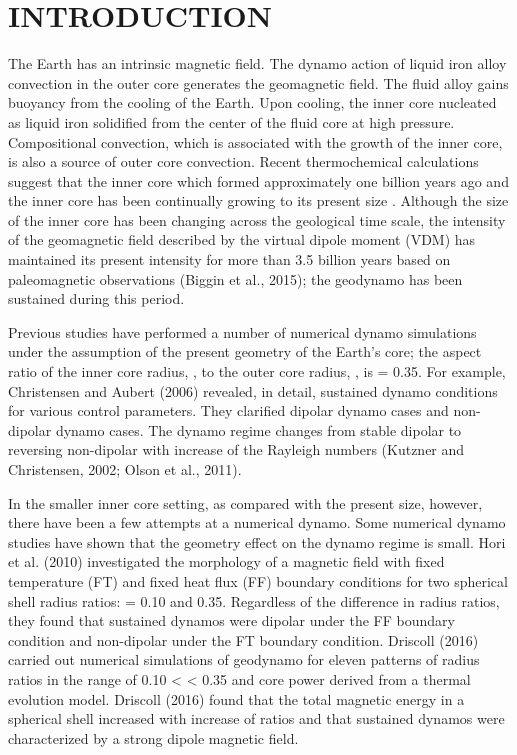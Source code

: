 \section{INTRODUCTION}
The Earth has an intrinsic magnetic field. The dynamo action of liquid iron alloy convection in the outer core generates the geomagnetic field. The fluid alloy gains buoyancy from the cooling of the Earth. Upon cooling, the inner core nucleated as liquid iron solidified from the center of the fluid core at high pressure. Compositional convection, which is associated with the growth of the inner core, is also a source of outer core convection. Recent thermochemical calculations suggest that the inner core which formed approximately one billion years ago and the inner core has been continually growing to its present size \cite{Labrosse:2001}. Although the size of the inner core has been changing across the geological time scale, the intensity of the geomagnetic field described by the virtual dipole moment (VDM) has maintained its present intensity for more than 3.5 billion years based on paleomagnetic observations (Biggin et al., 2015); the geodynamo has been sustained during this period.

Previous studies have performed a number of numerical dynamo simulations under the assumption of the present geometry of the Earth’s core; the aspect ratio of the inner core radius, , to the outer core radius, , is = 0.35. For example, Christensen and Aubert (2006) revealed, in detail, sustained dynamo conditions for various control parameters. They clarified dipolar dynamo cases and non-dipolar dynamo cases. The dynamo regime changes from stable dipolar to reversing non-dipolar with increase of the Rayleigh numbers (Kutzner and Christensen, 2002; Olson et al., 2011).

In the smaller inner core setting, as compared with the present size, however, there have been a few attempts at a numerical dynamo. Some numerical dynamo studies have shown that the geometry effect on the dynamo regime is small. Hori et al. (2010) investigated the morphology of a magnetic field with fixed temperature (FT) and fixed heat flux (FF) boundary conditions for two spherical shell radius ratios: = 0.10 and 0.35. Regardless of the difference in radius ratios, they found that sustained dynamos were dipolar under the FF boundary condition and non-dipolar under the FT boundary condition. Driscoll (2016) carried out numerical simulations of geodynamo for eleven patterns of radius ratios in the range of 0.10 <  < 0.35 and core power derived from a thermal evolution model. Driscoll (2016) found that the total magnetic energy in a spherical shell increased with increase of  ratios and that sustained dynamos were characterized by a strong dipole magnetic field.

